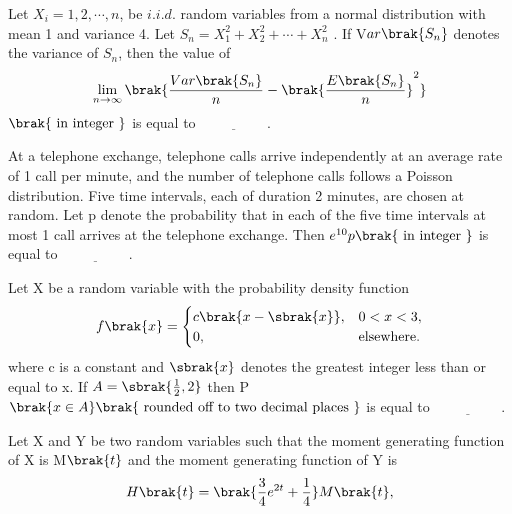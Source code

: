 \iffalse
\chapter{2022}
\author{AI24BTECH11032}
\section{st}
\fi
\item Let $X_{i} = 1, 2,\cdots, n$, be $i.i.d.$ random variables from a normal distribution with
mean 1 and variance 4. Let $S_{n}=X_{1}^{2}+X_{2}^{2}+\cdots+X_{n}^{2}$
. If V$ar\brak{S_{n}}$ denotes the
variance of $S_{n}$, then the value of 
\begin{align*}
    \lim_{n\to\infty}\brak{\frac{Var\brak{S_{n}}}{n}-\brak{\frac{E\brak{S_{n}}}{n}}^{2}}
\end{align*}
$\brak{\text{ in integer }}$ is equal to $\underline{\hspace{2cm}}.$
\bigskip
\item At a telephone exchange, telephone calls arrive independently at an average rate of 1 call per minute, and the number of telephone calls follows a Poisson distribution.
Five time intervals, each of duration 2 minutes, are chosen at random. Let p denote the probability that in each of the five time intervals at most 1 call arrives at the telephone exchange. Then $e^{10}p\brak{\text{ in integer }}$ is equal to $\underline{\hspace{2cm}}.$
\bigskip
\item Let X be a random variable with the probability density function 
\begin{align*}
    f\brak{x} = 
\begin{cases} 
c \brak{x - \sbrak{x}}, & 0 < x < 3, \\
0, & \text{elsewhere}.
\end{cases}
\end{align*}
where c is a constant and $\sbrak{x}$ denotes the greatest integer less than or equal to x. If $A=\sbrak{\frac{1}{2},2}$ then P$\brak{x\in A} \brak{\text{ rounded off to two decimal places }}$ is equal to $\underline{\hspace{2cm}}.$
\bigskip
\item Let X and Y be two random variables such that the moment generating function of X is M$\brak{t}$ and the moment generating function of Y is
\begin{align*}
    H\brak{t}=\brak{\frac{3}{4}e^{2t}+\frac{1}{4}}M\brak{t},
\end{align*}
